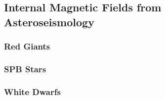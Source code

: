 {\color{red}
\subsection{Internal Magnetic Fields from Asteroseismology}

\subsubsection{Red Giants}

\subsubsection{SPB Stars}

\subsubsection{White Dwarfs}



}